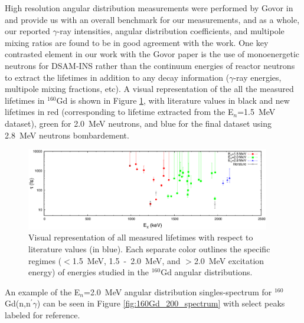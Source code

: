 High resolution angular distribution measurements were performed by Govor in \cite{Govor_160Gd_2009} and provide us with an overall benchmark for our measurements, and as a whole, our reported $\gamma$-ray intensities, angular distribution coefficients, and multipole mixing ratios are found to be in good agreement with the work. One key contrasted element in our work with the Govor paper is the use of monoenergetic neutrons for DSAM-INS rather than the continuum energies of reactor neutrons to extract the lifetimes in addition to any decay information ($\gamma$-ray energies, multipole mixing fractions, etc). A visual representation of the all the measured lifetimes in $^{160}$Gd is shown in Figure \ref{fig:160Gd_viz_lifetimes}, with literature values in black and new lifetimes in red (corresponding to lifetime extracted from the E$_n$=1.5~MeV dataset), green for 2.0~MeV neutrons, and blue for the final dataset using 2.8~MeV neutrons bombardement. %

\begin{figure}[h!]
\begin{center}
\includegraphics[width=0.95\textwidth]{figures/160Gd_viz_lifetimes.eps}
\caption{Visual representation of all measured lifetimes with respect to literature values (in blue). Each separate color outlines the specific regimes ($<$1.5~MeV, 1.5~-~2.0~MeV, and $>$2.0~MeV excitation energy) of energies studied in the $^{160}$Gd angular distributions. \label{fig:160Gd_viz_lifetimes}}
\end{center}
\end{figure}

An example of the E$_n$=2.0~MeV angular distribution singles-spectrum for $^{160}$Gd(n,n$^\prime\gamma$) can be seen in Figure \ref{fig:160Gd_200_spectrum} with select peaks labeled for reference.

